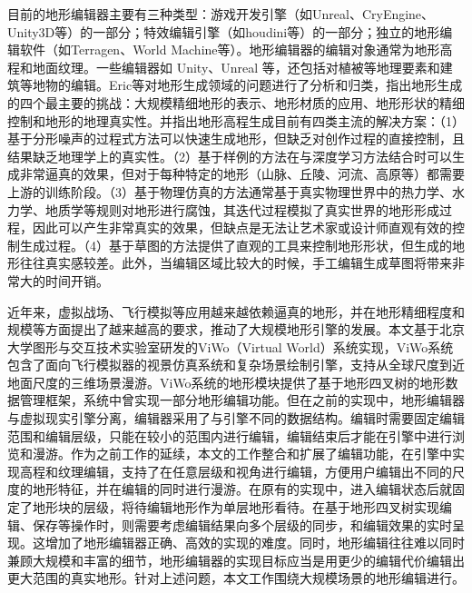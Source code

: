 目前的地形编辑器主要有三种类型：游戏开发引擎（如Unreal\supercite{unreal}、CryEngine\supercite{cry-engine}、Unity3D\supercite{unity}等）的一部分；特效编辑引擎（如houdini\supercite{houdini}等）的一部分；独立的地形编辑软件（如Terragen\supercite{terragen}、World Machine\supercite{world-machine}等）。地形编辑器的编辑对象通常为地形高程和地面纹理。一些编辑器如 Unity、Unreal 等，还包括对植被等地理要素和建筑等地物的编辑。Eric等\supercite{eric-review}对地形生成领域的问题进行了分析和归类，指出地形生成的四个最主要的挑战：大规模精细地形的表示、地形材质的应用、地形形状的精细控制和地形的地理真实性。并指出地形高程生成目前有四类主流的解决方案：（1）基于分形噪声的过程式方法\supercite{Belhadj2007Terrain}可以快速生成地形，但缺乏对创作过程的直接控制，且结果缺乏地理学上的真实性。（2）基于样例的方法\supercite{TasseEnhanced}在与深度学习方法结合时可以生成非常逼真的效果，但对于每种特定的地形（山脉、丘陵、河流、高原等）都需要上游的训练阶段。（3）基于物理仿真的方法\supercite{Mei2007Fast}通常基于真实物理世界中的热力学、水力学、地质学等规则对地形进行腐蚀，其迭代过程模拟了真实世界的地形形成过程，因此可以产生非常真实的效果，但缺点是无法让艺术家或设计师直观有效的控制生成过程。（4）基于草图的方法\supercite{Zhou2007Terrain}提供了直观的工具来控制地形形状，但生成的地形往往真实感较差。此外，当编辑区域比较大的时候，手工编辑生成草图将带来非常大的时间开销。\par
近年来，虚拟战场、飞行模拟等应用越来越依赖逼真的地形，并在地形精细程度和规模等方面提出了越来越高的要求，推动了大规模地形引擎的发展。本文基于北京大学图形与交互技术实验室研发的ViWo（Virtual World）系统实现，ViWo系统包含了面向飞行模拟器的视景仿真系统和复杂场景绘制引擎，支持从全球尺度到近地面尺度的三维场景漫游。ViWo系统的地形模块提供了基于地形四叉树的地形数据管理框架，系统中曾实现一部分地形编辑功能。但在之前的实现中，地形编辑器与虚拟现实引擎分离，编辑器采用了与引擎不同的数据结构。编辑时需要固定编辑范围和编辑层级，只能在较小的范围内进行编辑，编辑结束后才能在引擎中进行浏览和漫游。作为之前工作的延续，本文的工作整合和扩展了编辑功能，在引擎中实现高程和纹理编辑，支持了在任意层级和视角进行编辑，方便用户编辑出不同的尺度的地形特征，并在编辑的同时进行漫游。在原有的实现中，进入编辑状态后就固定了地形块的层级，将待编辑地形作为单层地形看待。在基于地形四叉树实现编辑、保存等操作时，则需要考虑编辑结果向多个层级的同步，和编辑效果的实时呈现。这增加了地形编辑器正确、高效的实现的难度。同时，地形编辑往往难以同时兼顾大规模和丰富的细节，地形编辑器的实现目标应当是用更少的编辑代价编辑出更大范围的真实地形。针对上述问题，本文工作围绕大规模场景的地形编辑进行。
